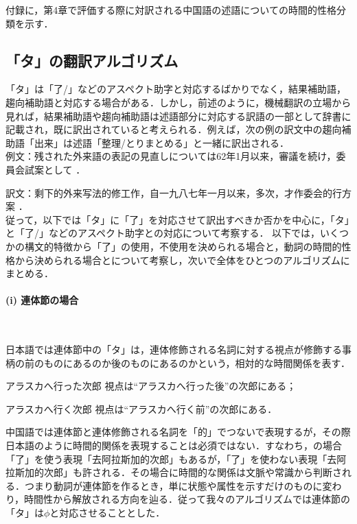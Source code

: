 付録に，第4章で評価する際に対訳される中国語の述語についての時間的性格分類を示す．


\subsection{「タ」の翻訳アルゴリズム}

「タ」は「了/」などのアスペクト助字と対応するばかりでなく，結果補助語，趨向補助語と対応する場合がある\cite{Cho1985}．しかし，前述のように，機械翻訳の立場から見れば，結果補助語や趨向補助語は述語部分に対応する訳語の一部として辞書に記載され，既に訳出されていると考えられる．例えば，次の例の訳文中の趨向補助語「出来」は述語「整理/とりまとめる」と一緒に訳出される．\\

例文：残された外来語の表記の見直しについては62年1月以来，審議を続け，委員会試案として ．

訳文：剩下的外来写法的修工作，自一九八七年一月以来，多次，才作委会的行方案 ．\\

従って，以下では「タ」に「了」を対応させて訳出すべきか否かを中心に，「タ」と「了/」などのアスペクト助字との対応について考察する．
以下では，いくつかの構文的特徴から「了」の使用，不使用を決められる場合と，動詞の時間的性格から決められる場合とについて考察し，次いで全体をひとつのアルゴリズムにまとめる．

\paragraph{(i) 連体節の場合}　

日本語では連体節中の「タ」は，連体修飾される名詞に対する視点が修飾する事柄の前のものにあるのか後のものにあるのかという，相対的な時間関係を表す．
\begin{enumerater}
\renewcommand{\labelenumi}{}
\renewcommand{\theenumi}{}
\item アラスカへ行った次郎	視点は``アラスカへ行った後''の次郎にある；
\item アラスカへ行く次郎	視点は``アラスカへ行く前''の次郎にある．
\end{enumerater}

中国語では連体節と連体修飾される名詞を「的」でつないで表現するが，その際日本語のように時間的関係を表現することは必須ではない．すなわち，の場合「了」を使う表現「去阿拉斯加的次郎」もあるが，「了」を使わない表現「去阿拉斯加的次郎」も許される．その場合に時間的な関係は文脈や常識から判断される．つまり動詞が連体節を作るとき，単に状態や属性を示すだけのものに変わり，時間性から解放される方向を辿る\cite{Cho1985}．従って我々のアルゴリズムでは連体節の「タ」は$\phi$と対応させることとした．

